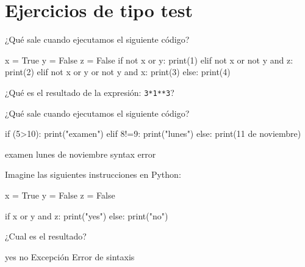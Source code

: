 \section*{Ejercicios de tipo test}


\begin{ejercicio}¿Qué sale cuando ejecutamos el siguiente código?

\begin{python}
x = True
y = False
z = False
if not x or y:
    print(1)
elif not x or not y and z:
    print(2)
elif not x or y or not y and x:
    print(3)
else:
    print(4)
\end{python}


\begin{choices}
\end{choices} 
\end{ejercicio}



\begin{ejercicio}¿Qué es el resultado de la expresión: \verb|3*1**3|?

\begin{choices}
\end{choices} \end{ejercicio}

\begin{ejercicio}¿Qué sale cuando ejecutamos el siguiente código?

\begin{python}
if (5>10):
    print("examen")
elif 8!=9:
    print("lunes")
else:
    print(11 de noviembre)
\end{python}

\begin{choices}
    \choice examen
    \choice lunes %
     de noviembre
    \choice syntax error
\end{choices} \end{ejercicio}



\begin{ejercicio}Imagine las siguientes instrucciones en Python:
\begin{python}
x = True
y = False
z = False

if x or y and z:
    print("yes")
else:
    print("no")
\end{python}

¿Cual es el resultado?

\begin{choices}
    \choice yes %
    \choice no
    \choice Excepción
    \choice Error de sintaxis
\end{choices} \end{ejercicio}

